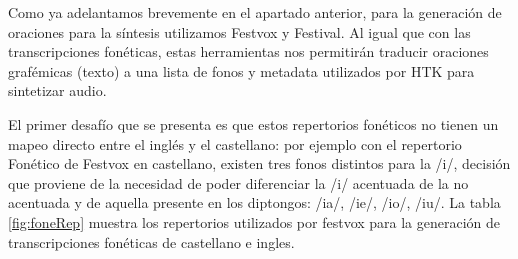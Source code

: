 
Como ya adelantamos brevemente en el apartado anterior, para la generación de oraciones para la síntesis utilizamos Festvox y Festival. Al igual que con las transcripciones fonéticas, estas herramientas nos permitirán traducir oraciones grafémicas (texto) a una lista de fonos y metadata utilizados por HTK para sintetizar audio.

El primer desafío que se presenta es que estos repertorios fonéticos no tienen un mapeo directo entre el inglés y el castellano: por ejemplo con el repertorio Fonético de Festvox en castellano, existen tres fonos distintos para la /i/, decisión que proviene de la necesidad de poder diferenciar la /i/ acentuada de la no acentuada  y de aquella presente en los diptongos: /ia/, /ie/, /io/, /iu/. La tabla \ref{fig:foneRep} muestra los repertorios utilizados por festvox para la generación de transcripciones fonéticas de castellano e ingles.


